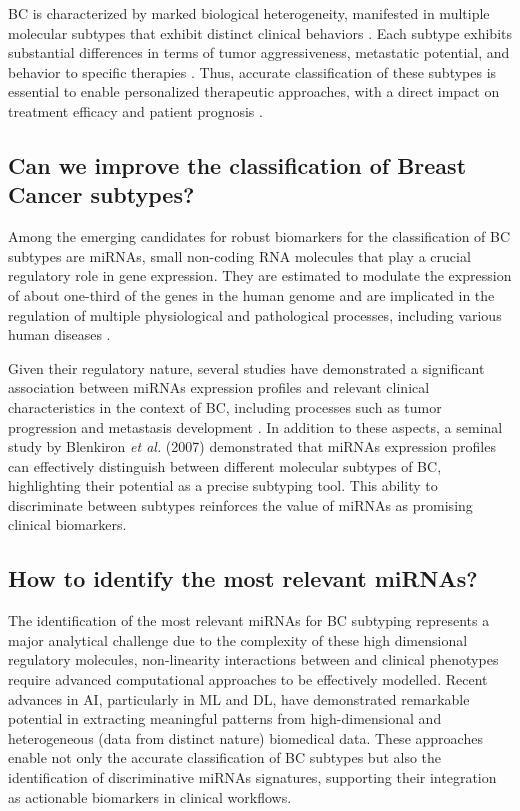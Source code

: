 BC is characterized by marked biological heterogeneity, manifested in multiple
molecular subtypes that exhibit distinct clinical behaviors
\textcite{bc_molecular_Perou2000}. Each subtype exhibits substantial
differences in terms of tumor aggressiveness, metastatic potential, and
behavior to specific therapies \textcite{bc_subtypes_Prat2015Clinical}. Thus,
accurate classification of these subtypes is essential to enable personalized
therapeutic approaches, with a direct impact on treatment efficacy and patient
prognosis \textcite{need_for_subtype_treatments_Testa2020Breast}.

\subsection{Can we improve the classification of Breast Cancer subtypes?}
Among the emerging candidates for robust biomarkers for the classification of
\gls{BC} subtypes are \gls{miRNAs}, small non-coding RNA molecules that play a
crucial regulatory role in gene expression. They are estimated to modulate the
expression of about one-third of the genes in the human genome
\textcite{mirna_importance_Hammond2015An} and are implicated in the regulation
of multiple physiological and pathological processes, including various human
diseases \textcite{mirna_as_biomarkers_Ho2022}.

Given their regulatory nature, several studies have demonstrated a significant
association between \gls{miRNAs} expression profiles and relevant clinical
characteristics in the context of \gls{BC}, including processes such as tumor
progression and metastasis development \textcite{mirna_as_biomarkers_Ho2022}
\textcite{mirnas_in_bc_Muñoz2023}
\textcite{mirna_as_bio_for_sub_Blenkiron2007MicroRNA}. In addition to these
aspects, a seminal study by Blenkiron \textit{et al.} (2007) demonstrated that
\gls{miRNAs} expression profiles can effectively distinguish between different
molecular subtypes of \gls{BC}, highlighting their potential as a precise
subtyping tool. This ability to discriminate between subtypes reinforces the
value of \gls{miRNAs} as promising clinical biomarkers.

\subsection{How to identify the most relevant miRNAs?}

The identification of the most relevant \gls{miRNAs} for \gls{BC} subtyping
represents a major analytical challenge due to the complexity of these high
dimensional regulatory molecules, non-linearity interactions between and
clinical phenotypes require advanced computational approaches to be effectively
modelled. Recent advances in \gls{AI}, particularly in \gls{ML} and \gls{DL},
have demonstrated remarkable potential in extracting meaningful patterns from
high-dimensional and heterogeneous (data from distinct nature) biomedical data.
These approaches enable not only the accurate classification of \gls{BC}
subtypes but also the identification of discriminative \gls{miRNAs} signatures,
supporting their integration as actionable biomarkers in clinical workflows.


